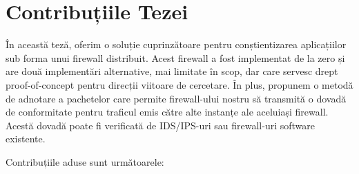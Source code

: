 \section*{Contribuțiile Tezei}

În această teză, oferim o soluție cuprinzătoare pentru conștientizarea aplicațiilor sub forma unui firewall distribuit. Acest firewall a fost implementat de la zero și are două implementări alternative, mai limitate în scop, dar care servesc drept proof-of-concept pentru direcții viitoare de cercetare. În plus, propunem o metodă de adnotare a pachetelor care permite firewall-ului nostru să transmită o dovadă de conformitate pentru traficul emis către alte instanțe ale aceluiași firewall. Acestă dovadă poate fi verificată de IDS/IPS-uri sau firewall-uri software existente.

Contribuțiile aduse sunt următoarele:

